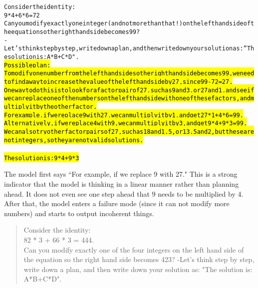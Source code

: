 \begin{AIbox}{\DV}
\scriptsize\vspace{-5px}
\parbox{1\textwidth}{
\begin{alltt}
Consider the identity: \\
9 * 4 + 6 * 6 = 72 \\
Can you modify exactly one integer (and not more than that!) on the left hand side of the equation so the right hand side becomes 99? \\
-Let's think step by step, write down a plan, and then write down your solution as: ``The solution is: A*B+C*D". \\

\hl{Possible plan: \\
To modify one number from the left hand side so the right hand side becomes 99, we need to find a way to increase the value of the left hand side by 27, since 99 - 72 = 27. \\
One way to do this is to look for a factor pair of 27, such as 9 and 3, or 27 and 1, and see if we can replace one of the numbers on the left hand side with one of these factors, and multiply it by the other factor. \\
For example, if we replace 9 with 27, we can multiply it by 1, and get 27 * 1 + 4 * 6 = 99. \\
Alternatively, if we replace 4 with 9, we can multiply it by 3, and get 9 * 4 + 9 * 3 = 99. \\
We can also try other factor pairs of 27, such as 18 and 1.5, or 13.5 and 2, but these are not integers, so they are not valid solutions. \\ \\
The solution is: 9 * 4 + 9 * 3 }
\end{alltt}
}
\end{AIbox}


The model first says ``For example, if we replace 9 with 27."  This is a strong indicator that the model is thinking in a linear manner rather than planning ahead. It does not even see one step ahead that 9 needs to be multiplied by 4. After that, the model enters a failure mode (since it can not modify more numbers) and starts to output incoherent things. 

\iffalse

\begin{quote}
Consider the identity: \\
82 * 3 + 66 * 3 = 444. \\
Can you modify exactly one of the four integers on the left hand side of the equation so the right hand side becomes 423?
-Let's think step by step, write down a plan, and then write down your solution as: "The solution is: A*B+C*D".
\end{quote}

